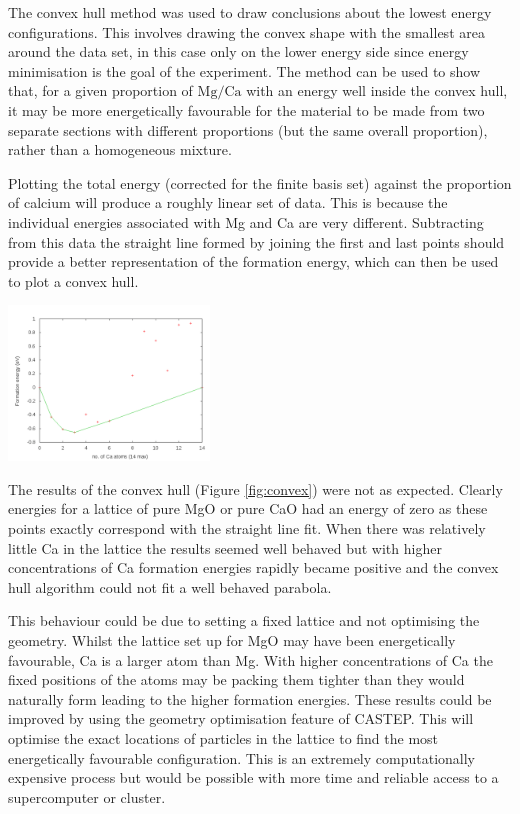 \documentclass[a4paper,12pt]{article}
\begin{document}
\begin{multicols}{2}
	The convex hull method\cite{jarvis1973identification} was used to draw conclusions about the lowest energy configurations. This involves drawing the convex shape with the smallest area around the data set, in this case only on the lower energy side since energy minimisation is the goal of the experiment. The method can be used to show that, for a given proportion of $\mathrm{Mg}/\mathrm{Ca}$ with an energy well inside the convex hull, it may be more energetically favourable for the material to be made from two separate sections with different proportions (but the same overall proportion), rather than a homogeneous mixture.
	
	Plotting the total energy (corrected for the finite basis set) against the proportion of calcium will produce a roughly linear set of data. This is because the individual energies associated with Mg and Ca are very different. Subtracting from this data the straight line formed by joining the first and last points should provide a better representation of the formation energy, which can then be used to plot a convex hull.
    \begin{center}
	    \includegraphics[keepaspectratio=true,width=0.4\textwidth]{convex}
		\label{fig:convex} 
	\end{center}
    The results of the convex hull (Figure \ref{fig:convex}) were not as expected.  Clearly energies for a lattice of pure MgO or pure CaO had an energy of zero as these points exactly correspond with the straight line fit. When there was relatively little Ca in the lattice the results seemed well behaved but with higher concentrations of Ca formation energies rapidly became positive and the convex hull algorithm could not fit a well behaved parabola.
    
    This behaviour could be due to setting a fixed lattice and not optimising the geometry. Whilst the lattice set up for MgO may have been energetically favourable, Ca is a larger atom than Mg. With higher concentrations of Ca the fixed positions of the atoms may be packing them tighter than they would naturally form leading to the higher formation energies. These results could be improved by using the geometry optimisation feature of CASTEP. This will optimise the exact locations of particles in the lattice to find the most energetically favourable configuration. This is  an extremely computationally expensive process but would be possible with more time and reliable access to a supercomputer or cluster.
	
\raggedright


\end{multicols}
\end{document}
